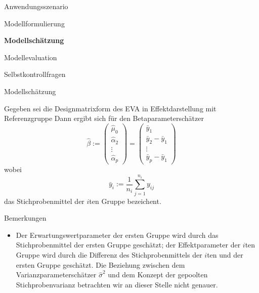 \documentclass[
  8pt,
  ignorenonframetext,
]{beamer}
\providecommand{\tightlist}{%
  \setlength{\itemsep}{0pt}\setlength{\parskip}{0pt}}
\begin{document}
\begin{frame}{}
\protect\hypertarget{section-5}{}
\large
{}
\vfill

Anwendungsszenario

Modellformulierung

\textbf{Modellschätzung}

Modellevaluation

Selbstkontrollfragen \vfill
\end{frame}

\begin{frame}{Modellschätzung}
\protect\hypertarget{modellschuxe4tzung}{}
\footnotesize
\begin{theorem}
\justifying
\normalfont
Gegeben sei die Designmatrixform des EVA in Effektdarstellung mit Referenzgruppe
Dann ergibt sich für den Betaparameterschätzer
\begin{equation}
\hat{\beta}
:= \begin{pmatrix} \hat{\mu}_0 \\ \hat{\alpha}_2        \\ \vdots \\ \hat{\alpha}_p \end{pmatrix}
= \begin{pmatrix} \bar{y}_1   \\ \bar{y}_2 - \bar{y}_1 \\ \vdots \\ \bar{y}_p - \bar{y}_1  \end{pmatrix}
\end{equation}
wobei
\begin{equation}
\bar{y}_i := \frac{1}{n_i}\sum_{j=1}^{n_i}y_{ij}
\end{equation}
das Stichprobenmittel der $i$ten Gruppe bezeichent.
\end{theorem}

Bemerkungen

\begin{itemize}
\tightlist
\item
  \justifying Der Erwartungswertparameter der ersten Gruppe wird durch
  das Stichprobenmittel der ersten Gruppe geschätzt; der Effektparameter
  der \(i\)ten Gruppe wird durch die Differenz des Stichprobenmittels
  der \(i\)ten und der ersten Gruppe geschätzt. Die Beziehung zwischen
  dem Varianzparameterschätzer \(\hat{\sigma}^2\) und dem Konzept der
  gepoolten Stichprobenvarianz betrachten wir an dieser Stelle nicht
  genauer.
\end{itemize}
\end{frame}
\end{document}
